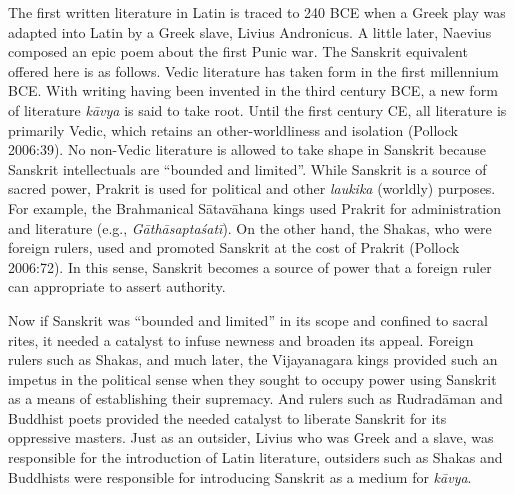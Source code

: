 The first written literature in Latin is traced to 240 BCE when a Greek play was adapted into Latin by a Greek slave, Livius Andronicus. A little later, Naevius composed an epic poem about the first Punic war. The Sanskrit equivalent offered here is as follows. Vedic literature has taken form in the first millennium BCE\@. With writing having been invented in the third century BCE, a new form of literature {\sl kāvya} is said to take root. Until the first century CE, all literature is primarily Vedic, which retains an other-worldliness and isolation (Pollock 2006:39). No non-Vedic literature is allowed to take shape in Sanskrit because Sanskrit intellectuals are “bounded and limited”. While Sanskrit is a source of sacred power, Prakrit is used for political and other {\sl laukika} (worldly) purposes. For example, the Brahmanical Sātavāhana kings used Prakrit for administration and literature (e.g., {\sl Gāthāsaptaśatī}). On the other hand, the Shakas, who were foreign rulers, used and promoted Sanskrit at the cost of Prakrit (Pollock 2006:72). In this sense, Sanskrit becomes a source of power that a foreign ruler can appropriate to assert authority.

Now if Sanskrit was “bounded and limited” in its scope and confined to sacral rites, it needed a catalyst to infuse newness and broaden its appeal. Foreign rulers such as Shakas, and much later, the Vijayanagara kings provided such an impetus in the political sense when they sought to occupy power using Sanskrit as a means of establishing their supremacy. And rulers such as Rudradāman and Buddhist poets provided the needed catalyst to liberate Sanskrit for its oppressive masters. Just as an outsider, Livius who was Greek and a slave, was responsible for the introduction of Latin literature, outsiders such as Shakas and Buddhists were responsible for introducing Sanskrit as a medium for {\sl kāvya}.

